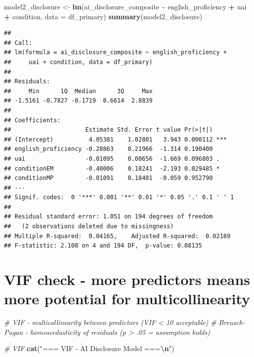 \documentclass[
]{article}
\newenvironment{Shaded}{\begin{snugshade}}{\end{snugshade}}
\newcommand{\AttributeTok}[1]{\textcolor[rgb]{0.13,0.29,0.53}{#1}}
\newcommand{\CommentTok}[1]{\textcolor[rgb]{0.56,0.35,0.01}{\textit{#1}}}
\newcommand{\FunctionTok}[1]{\textcolor[rgb]{0.13,0.29,0.53}{\textbf{#1}}}
\newcommand{\NormalTok}[1]{#1}
\newcommand{\OtherTok}[1]{\textcolor[rgb]{0.56,0.35,0.01}{#1}}
\newcommand{\SpecialCharTok}[1]{\textcolor[rgb]{0.81,0.36,0.00}{\textbf{#1}}}
\newcommand{\StringTok}[1]{\textcolor[rgb]{0.31,0.60,0.02}{#1}}
\begin{document}
\begin{Shaded}
\begin{Highlighting}[]
\NormalTok{model2\_disclosure }\OtherTok{\textless{}{-}} \FunctionTok{lm}\NormalTok{(ai\_disclosure\_composite }\SpecialCharTok{\textasciitilde{}}\NormalTok{ english\_proficiency }\SpecialCharTok{+}\NormalTok{ uai }\SpecialCharTok{+}\NormalTok{ condition, }\AttributeTok{data =}\NormalTok{ df\_primary)}
\FunctionTok{summary}\NormalTok{(model2\_disclosure)}
\end{Highlighting}
\end{Shaded}

\begin{verbatim}
## 
## Call:
## lm(formula = ai_disclosure_composite ~ english_proficiency + 
##     uai + condition, data = df_primary)
## 
## Residuals:
##     Min      1Q  Median      3Q     Max 
## -1.5161 -0.7827 -0.1719  0.6614  2.8839 
## 
## Coefficients:
##                     Estimate Std. Error t value Pr(>|t|)    
## (Intercept)          4.05381    1.02801   3.943 0.000112 ***
## english_proficiency -0.28863    0.21966  -1.314 0.190400    
## uai                 -0.01095    0.00656  -1.669 0.096803 .  
## conditionEM         -0.40006    0.18241  -2.193 0.029485 *  
## conditionMP         -0.01091    0.18401  -0.059 0.952790    
## ---
## Signif. codes:  0 '***' 0.001 '**' 0.01 '*' 0.05 '.' 0.1 ' ' 1
## 
## Residual standard error: 1.051 on 194 degrees of freedom
##   (2 observations deleted due to missingness)
## Multiple R-squared:  0.04165,    Adjusted R-squared:  0.02189 
## F-statistic: 2.108 on 4 and 194 DF,  p-value: 0.08135
\end{verbatim}

\section{VIF check - more predictors means more potential for
multicollinearity}\label{vif-check---more-predictors-means-more-potential-for-multicollinearity}

\begin{Shaded}
\begin{Highlighting}[]
\CommentTok{\# VIF {-} multicollinearity between predictors (VIF \textless{} 10 acceptable)}
\CommentTok{\# Breusch{-}Pagan {-} homoscedasticity of residuals (p \textgreater{} .05 = assumption holds)}

\CommentTok{\# VIF}
\FunctionTok{cat}\NormalTok{(}\StringTok{"=== VIF {-} AI Disclosure Model ===}\SpecialCharTok{\textbackslash{}n}\StringTok{"}\NormalTok{)}
\end{Highlighting}
\end{Shaded}
\end{document}
